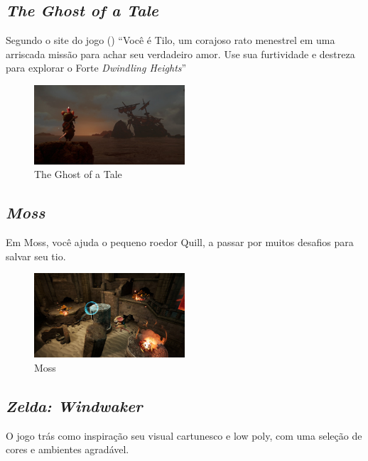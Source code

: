 \subsection{\textit{The Ghost of a Tale}} Segundo o site do jogo (\citeyear{Ghostofa36:online})  ``Você é Tilo,
um corajoso rato menestrel em uma arriscada missão para achar seu verdadeiro
amor. Use sua furtividade e destreza para explorar o Forte \textit{Dwindling
Heights}''

\begin{figure}[!htb] \caption{\label{tale}The Ghost of a Tale} \begin{center}
\includegraphics[width=0.5\textwidth]{imagens/tale.jpg} \end{center}
 \end{figure}

\subsection{\textit{Moss}}
Em Moss, você ajuda o pequeno roedor Quill, a passar por muitos desafios para salvar seu tio. \cite{Moss18}

\begin{figure}[!htb] \caption{\label{fig_moss}Moss} \begin{center}
\includegraphics[width=0.5\textwidth]{imagens/moss.jpg} \end{center}
 \end{figure}


\subsection{\textit{Zelda: Windwaker}}
O jogo trás como inspiração seu visual cartunesco e low poly, com uma seleção de cores e ambientes agradável.

